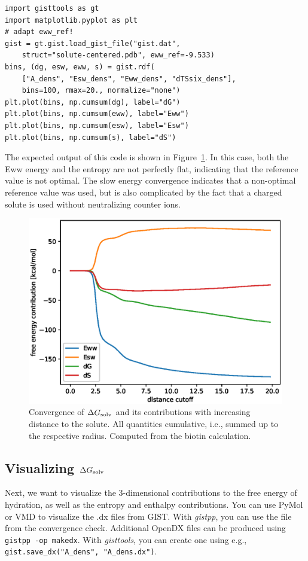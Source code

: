 \documentclass[9pt,tutorial]{livecoms}
\newcommand{\dgsolv}{\Delta G_\textup{solv}}
\newcommand{\software}{\emph}
\newcommand\inlinecode{\texttt}
\begin{document}
\begin{lstlisting}[style=python]
import gisttools as gt
import matplotlib.pyplot as plt
# adapt eww_ref!
gist = gt.gist.load_gist_file("gist.dat",
    struct="solute-centered.pdb", eww_ref=-9.533)
bins, (dg, esw, eww, s) = gist.rdf(
    ["A_dens", "Esw_dens", "Eww_dens", "dTSsix_dens"],
    bins=100, rmax=20., normalize="none")
plt.plot(bins, np.cumsum(dg), label="dG")
plt.plot(bins, np.cumsum(eww), label="Eww")
plt.plot(bins, np.cumsum(esw), label="Esw")
plt.plot(bins, np.cumsum(s), label="dS")
\end{lstlisting}

The expected output of this code is shown in Figure~\ref{fig_radial_convergence}.
In this case, both the Eww energy and the entropy are not perfectly flat, indicating that the reference value is not optimal.
The slow energy convergence indicates that a non-optimal reference value was used, but is also complicated by the fact that a charged solute is used without neutralizing counter ions.


\begin{figure}
	\centering
	\includegraphics[width=0.8\linewidth]{figures/A_E_S_convergence.eps}
	\caption{Convergence of $\dgsolv$ and its contributions with increasing distance to the solute. All quantities cumulative, i.e., summed up to the respective radius. Computed from the biotin calculation.}\label{fig_radial_convergence}
\end{figure}

\subsection{Visualizing $\dgsolv$}
Next, we want to visualize the 3-dimensional contributions to the free energy of hydration, as well as the entropy and enthalpy contributions.
You can use PyMol\cite{pymol} or VMD\cite{vmd} to visualize the .dx files from GIST\@.
With \software{gistpp}, you can use the file from the convergence check. Additional OpenDX files can be produced using \inlinecode{gistpp -op makedx}.
With \software{gisttools}, you can create one using e.g., \inlinecode{gist.save\_dx("A\_dens", "A\_dens.dx")}.
\end{document}
